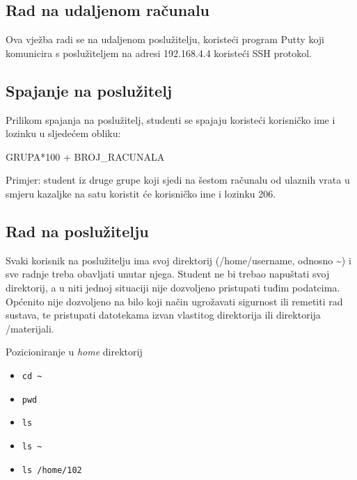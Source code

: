 
\subsection*{Rad na udaljenom računalu}

Ova vježba radi se na udaljenom poslužitelju, koristeći program Putty koji komunicira s poslužiteljem na adresi 192.168.4.4 koristeći SSH protokol.

\subsection*{Spajanje na poslužitelj}
Prilikom spajanja na poslužitelj, studenti se spajaju koristeći korisničko ime i lozinku u sljedećem obliku: 

GRUPA*100 + BROJ\_RACUNALA

Primjer: student iz druge grupe koji sjedi na šestom računalu od ulaznih vrata u smjeru kazaljke na satu koristit će korisničko ime i lozinku 206.

\subsection*{Rad na poslužitelju}
Svaki korisnik na poslužitelju ima svoj direktorij (/home/username, odnosno \textasciitilde) i sve radnje treba obavljati unutar njega. Student ne bi trebao napuštati svoj direktorij, a u niti jednoj situaciji nije dozvoljeno pristupati tuđim podatcima. Općenito nije dozvoljeno na bilo koji način ugrožavati sigurnost ili remetiti rad sustava, te pristupati datotekama izvan vlastitog direktorija ili direktorija /materijali.

\begin{primjer}
	Pozicioniranje u \textit{home} direktorij
	\begin{itemize}
		\item \lstinline!cd ~!
		\item \lstinline!pwd!
		\item \lstinline!ls!
		\item \lstinline!ls ~!
		\item \lstinline!ls /home/102! 
	\end{itemize}
\end{primjer}

